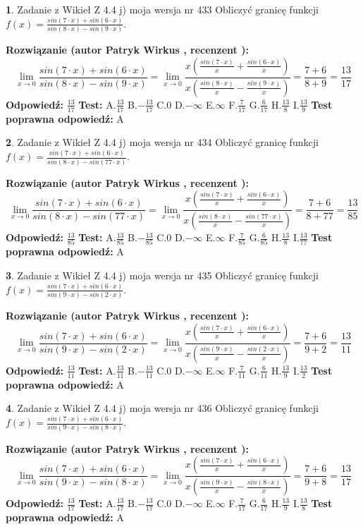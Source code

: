 \documentclass[12pt, a4paper]{article}
\theoremstyle{definition} %
\newtheorem{zad}{}
\newcommand{\zadStart}[1]{\begin{zad}#1\newline}
\newcommand{\zadStop}{\end{zad}}
\newcommand{\rozwStart}[2]{\noindent \textbf{Rozwiązanie (autor #1 , recenzent #2): }\newline}
\newcommand{\rozwStop}{\newline}
\newcommand{\odpStart}{\noindent \textbf{Odpowiedź:}\newline}
\newcommand{\odpStop}{\newline}
\newcommand{\testStart}{\noindent \textbf{Test:}\newline}
\newcommand{\testStop}{\newline}
\newcommand{\kluczStart}{\noindent \textbf{Test poprawna odpowiedź:}\newline}
\newcommand{\kluczStop}{\newline}
\begin{document}
\zadStart{Zadanie z Wikieł Z 4.4 j) moja wersja nr 433}
Obliczyć granicę funkcji $f(x)=\frac{sin(7\cdot x) +sin(6\cdot x)}{sin(8\cdot x) -sin(9\cdot x)}$.
\zadStop
\rozwStart{Patryk Wirkus}{}
$$\lim\limits_{x\to 0}\frac{sin(7\cdot x) +sin(6\cdot x)}{sin(8\cdot x) -sin(9\cdot x)}=\lim\limits_{x\to 0}\frac{x(\frac{sin(7\cdot x)}{x}+\frac{sin(6\cdot x)}{x})}{x(\frac{sin(8\cdot x)}{x}-\frac{sin(9\cdot x)}{x})}=\frac{7+6}{8+9} = \frac{13}{17}$$
\rozwStop
\odpStart
$\frac{13}{17}$
\odpStop
\testStart
A.$\frac{13}{17}$
B.$-\frac{13}{17}$
C.$0$
D.$-\infty$
E.$\infty$
F.$\frac{7}{17}$
G.$\frac{6}{17}$
H.$\frac{13}{8}$
I.$\frac{13}{9}$
\testStop
\kluczStart
A
\kluczStop



\zadStart{Zadanie z Wikieł Z 4.4 j) moja wersja nr 434}
Obliczyć granicę funkcji $f(x)=\frac{sin(7\cdot x) +sin(6\cdot x)}{sin(8\cdot x) -sin(77\cdot x)}$.
\zadStop
\rozwStart{Patryk Wirkus}{}
$$\lim\limits_{x\to 0}\frac{sin(7\cdot x) +sin(6\cdot x)}{sin(8\cdot x) -sin(77\cdot x)}=\lim\limits_{x\to 0}\frac{x(\frac{sin(7\cdot x)}{x}+\frac{sin(6\cdot x)}{x})}{x(\frac{sin(8\cdot x)}{x}-\frac{sin(77\cdot x)}{x})}=\frac{7+6}{8+77} = \frac{13}{85}$$
\rozwStop
\odpStart
$\frac{13}{85}$
\odpStop
\testStart
A.$\frac{13}{85}$
B.$-\frac{13}{85}$
C.$0$
D.$-\infty$
E.$\infty$
F.$\frac{7}{85}$
G.$\frac{6}{85}$
H.$\frac{13}{8}$
I.$\frac{13}{77}$
\testStop
\kluczStart
A
\kluczStop



\zadStart{Zadanie z Wikieł Z 4.4 j) moja wersja nr 435}
Obliczyć granicę funkcji $f(x)=\frac{sin(7\cdot x) +sin(6\cdot x)}{sin(9\cdot x) -sin(2\cdot x)}$.
\zadStop
\rozwStart{Patryk Wirkus}{}
$$\lim\limits_{x\to 0}\frac{sin(7\cdot x) +sin(6\cdot x)}{sin(9\cdot x) -sin(2\cdot x)}=\lim\limits_{x\to 0}\frac{x(\frac{sin(7\cdot x)}{x}+\frac{sin(6\cdot x)}{x})}{x(\frac{sin(9\cdot x)}{x}-\frac{sin(2\cdot x)}{x})}=\frac{7+6}{9+2} = \frac{13}{11}$$
\rozwStop
\odpStart
$\frac{13}{11}$
\odpStop
\testStart
A.$\frac{13}{11}$
B.$-\frac{13}{11}$
C.$0$
D.$-\infty$
E.$\infty$
F.$\frac{7}{11}$
G.$\frac{6}{11}$
H.$\frac{13}{9}$
I.$\frac{13}{2}$
\testStop
\kluczStart
A
\kluczStop



\zadStart{Zadanie z Wikieł Z 4.4 j) moja wersja nr 436}
Obliczyć granicę funkcji $f(x)=\frac{sin(7\cdot x) +sin(6\cdot x)}{sin(9\cdot x) -sin(8\cdot x)}$.
\zadStop
\rozwStart{Patryk Wirkus}{}
$$\lim\limits_{x\to 0}\frac{sin(7\cdot x) +sin(6\cdot x)}{sin(9\cdot x) -sin(8\cdot x)}=\lim\limits_{x\to 0}\frac{x(\frac{sin(7\cdot x)}{x}+\frac{sin(6\cdot x)}{x})}{x(\frac{sin(9\cdot x)}{x}-\frac{sin(8\cdot x)}{x})}=\frac{7+6}{9+8} = \frac{13}{17}$$
\rozwStop
\odpStart
$\frac{13}{17}$
\odpStop
\testStart
A.$\frac{13}{17}$
B.$-\frac{13}{17}$
C.$0$
D.$-\infty$
E.$\infty$
F.$\frac{7}{17}$
G.$\frac{6}{17}$
H.$\frac{13}{9}$
I.$\frac{13}{8}$
\testStop
\kluczStart
A
\kluczStop
\end{document}
